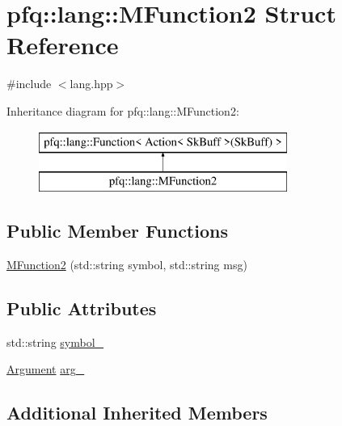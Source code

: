 \hypertarget{structpfq_1_1lang_1_1MFunction2}{\section{pfq\+:\+:lang\+:\+:M\+Function2 Struct Reference}
\label{structpfq_1_1lang_1_1MFunction2}
}


{\ttfamily \#include $<$lang.\+hpp$>$}

Inheritance diagram for pfq\+:\+:lang\+:\+:M\+Function2\+:\begin{figure}[H]
\begin{center}
\leavevmode
\includegraphics[height=2.000000cm]{structpfq_1_1lang_1_1MFunction2}
\end{center}
\end{figure}
\subsection*{Public Member Functions}
\begin{DoxyCompactItemize}
\item 
\hyperlink{structpfq_1_1lang_1_1MFunction2_a99bc09be54f48e9f2305feb79a2fa372}{M\+Function2} (std\+::string symbol, std\+::string msg)
\end{DoxyCompactItemize}
\subsection*{Public Attributes}
\begin{DoxyCompactItemize}
\item 
std\+::string \hyperlink{structpfq_1_1lang_1_1MFunction2_afdd71c7aed6b8f5f801bfd6c98f7274d}{symbol\+\_\+}
\item 
\hyperlink{structpfq_1_1lang_1_1Argument}{Argument} \hyperlink{structpfq_1_1lang_1_1MFunction2_a785a0845ac0b184e1e31711d920ebe50}{arg\+\_\+}
\end{DoxyCompactItemize}
\subsection*{Additional Inherited Members}


